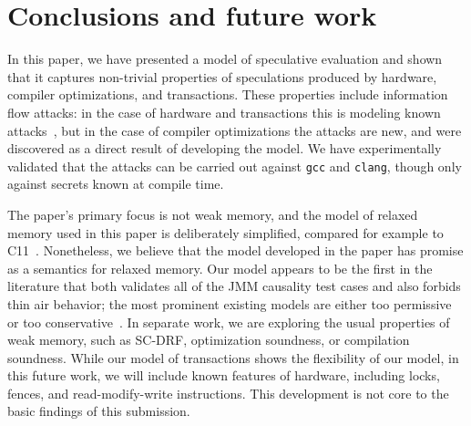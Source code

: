 \section{Conclusions and future work}

In this paper, we have presented a model of speculative evaluation and
shown that it captures non-trivial properties of speculations produced
by hardware, compiler optimizations, and transactions. These properties
include information flow attacks: in the case of hardware and transactions
this is modeling known attacks~\cite{DBLP:journals/corr/abs-1801-01203,DBLP:conf/uss/DisselkoenKPT17},
but in the case of compiler optimizations the attacks are new, and were
discovered as a direct result of developing the model. We have experimentally
validated that the attacks can be carried out against \verb|gcc| and \verb|clang|,
though only against secrets known at compile time.

The paper's primary focus is not weak memory, and the model of relaxed memory used in this paper is deliberately
simplified, compared for example to
C11~\cite{Boehm:2008:FCC:1375581.1375591,Batty:2011:MCC:1926385.1926394}. Nonetheless, we believe that the model developed in the paper has promise as a semantics for relaxed memory. Our model appears to be the first in the literature that both validates all of the JMM causality test cases and also forbids thin air behavior; the most prominent existing models are either too permissive~\cite{Manson:2005:JMM:1047659.1040336, Jagadeesan:2010:GOS:2175486.2175503,DBLP:conf/popl/KangHLVD17} or too conservative~\cite{DBLP:conf/lics/JeffreyR16}.  In separate work, we are exploring the usual properties of weak memory, such as SC-DRF, optimization soundness, or compilation soundness.   While our model of transactions shows the flexibility of our model, in this future work, we will include known features of hardware, including locks, fences, and read-modify-write instructions.  This development is not core to the basic findings of this submission.




